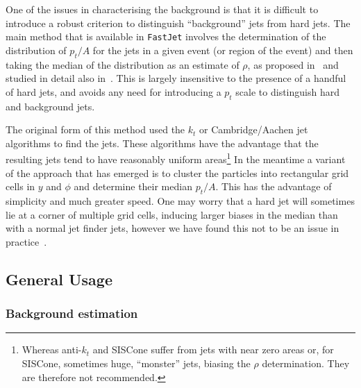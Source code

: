 \documentclass[12pt,a4]{article}
\newcommand{\fastjet}{\texttt{FastJet}\xspace}
\begin{document}
One of the issues in characterising the background is that it is
difficult to introduce a robust criterion to distinguish
``background'' jets from hard jets.
%
The main method that is available in \fastjet involves the
determination of the distribution of $p_t/A$ for the jets in a given
event (or region of the event) and then taking the median of the
distribution as an estimate of $\rho$, as proposed in~\cite{cs} and
studied in detail also in~\cite{Cacciari:2009dp,Soyez:2018opl}.
%
This is largely insensitive to the presence of a handful of hard jets, and
avoids any need for introducing a $p_t$ scale to distinguish hard and
background jets.


The original form of this method used the $k_t$ or Cambridge/Aachen
jet algorithms to find the jets.
%
These algorithms have the advantage that the resulting jets tend to
have reasonably uniform areas\footnote{Whereas anti-$k_t$ and SISCone
  suffer from jets with near zero areas or, for SISCone, sometimes
  huge, ``monster'' jets, biasing the $\rho$ determination. They are
  therefore not recommended.}
%
In the meantime a variant of the approach that has emerged is to
cluster the particles into rectangular grid cells in $y$ and $\phi$
and determine their median $p_t/A$.
%
This has the advantage of simplicity and much greater speed. 
%
One may worry that a hard jet will sometimes lie at a corner of
multiple grid cells, inducing larger biases in the median than with a
normal jet finder jets, however we have found this not
to be an issue in practice~\cite{Soyez:2018opl}.

\subsection{General Usage}\label{sec:bkg_general_usage}

\subsubsection{Background estimation}\label{sec:bkg_estim_usage}
\end{document}
